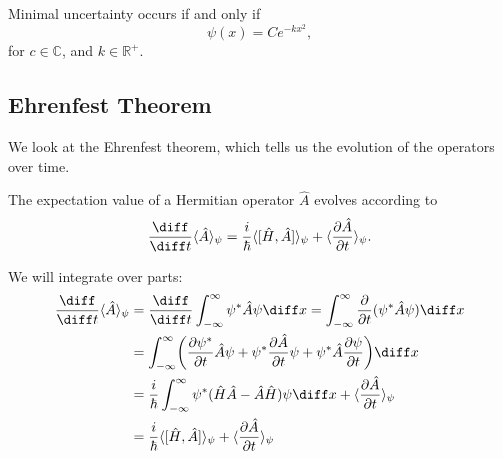\documentclass[12pt]{article}
\begin{document}
\begin{lemma}
	Minimal uncertainty occurs if and only if
	\[
		\psi(x) = C e^{-kx^2}
	,\]
	for $c \in \mathbb{C}$, and $k \in \mathbb{R}^{+}$.
\end{lemma}

\subsection{Ehrenfest Theorem}%
\label{sub:ehrenfest_theorem}

We look at the Ehrenfest theorem, which tells us the evolution of the operators over time.

\begin{theorem}
	The expectation value of a Hermitian operator $\hat A$ evolves according to
	\[
		\frac{\diff}{\diff t} \langle \hat A \rangle_{\psi} = \frac{i}{\hbar} \langle [\hat H, \hat A ] \rangle_{\psi} + \langle \frac{\partial \hat A}{\partial t} \rangle_{\psi}
	.\]
\end{theorem}

\begin{proofbox}
	We will integrate over parts:
	\begin{align*}
		\frac{\diff}{\diff t} \langle \hat A \rangle_{\psi} &= \frac{\diff}{\diff t} \int_{-\infty}^{\infty} \psi^{\ast} \hat A \psi \diff x = \int_{-\infty}^{\infty} \frac{\partial}{\partial t} (\psi^{\ast} \hat A \psi) \diff x \\
							   &= \int_{-\infty}^{\infty} \biggl( \frac{\partial \psi^{\ast}}{\partial t} \hat A \psi + \psi^{\ast} \frac{\partial \hat A}{\partial t} \psi + \psi^{\ast} \hat A \frac{\partial \psi}{\partial t} \biggr) \diff x \\
							   &= \frac{i}{\hbar} \int_{-\infty}^{\infty} \psi^{\ast} (\hat H \hat A - \hat A \hat H)\psi \diff x + \langle \frac{\partial \hat A}{\partial t} \rangle_{\psi} \\
							   &= \frac{i}{\hbar} \langle [\hat H, \hat A]\rangle_{\psi} + \langle \frac{\partial \hat A}{\partial t} \rangle_{\psi}
	\end{align*}
\end{proofbox}
\end{document}
